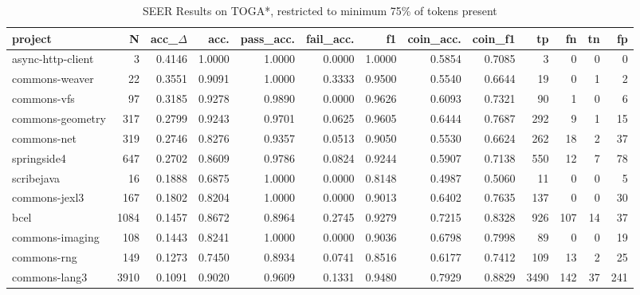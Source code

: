 \begin{table*}
\centering
\caption{SEER Results on TOGA*, restricted to minimum 75\% of tokens present}
\label{tab:toga_results_25}
\begin{tabular}{lrrrrrrrrrrrr}
\toprule
                project &      N &  acc\_$\Delta$ &    acc. &  pass\_acc. &  fail\_acc. &      f1 &  coin\_acc. &  coin\_f1 &     tp &   fn &   tn &    fp \\
\midrule
      async-http-client &      3 &      0.4146 &  1.0000 &     1.0000 &     0.0000 &  1.0000 &     0.5854 &   0.7085 &      3 &    0 &    0 &     0 \\
         commons-weaver &     22 &      0.3551 &  0.9091 &     1.0000 &     0.3333 &  0.9500 &     0.5540 &   0.6644 &     19 &    0 &    1 &     2 \\
            commons-vfs &     97 &      0.3185 &  0.9278 &     0.9890 &     0.0000 &  0.9626 &     0.6093 &   0.7321 &     90 &    1 &    0 &     6 \\
       commons-geometry &    317 &      0.2799 &  0.9243 &     0.9701 &     0.0625 &  0.9605 &     0.6444 &   0.7687 &    292 &    9 &    1 &    15 \\
            commons-net &    319 &      0.2746 &  0.8276 &     0.9357 &     0.0513 &  0.9050 &     0.5530 &   0.6624 &    262 &   18 &    2 &    37 \\
            springside4 &    647 &      0.2702 &  0.8609 &     0.9786 &     0.0824 &  0.9244 &     0.5907 &   0.7138 &    550 &   12 &    7 &    78 \\
             scribejava &     16 &      0.1888 &  0.6875 &     1.0000 &     0.0000 &  0.8148 &     0.4987 &   0.5060 &     11 &    0 &    0 &     5 \\
          commons-jexl3 &    167 &      0.1802 &  0.8204 &     1.0000 &     0.0000 &  0.9013 &     0.6402 &   0.7635 &    137 &    0 &    0 &    30 \\
                   bcel &   1084 &      0.1457 &  0.8672 &     0.8964 &     0.2745 &  0.9279 &     0.7215 &   0.8328 &    926 &  107 &   14 &    37 \\
        commons-imaging &    108 &      0.1443 &  0.8241 &     1.0000 &     0.0000 &  0.9036 &     0.6798 &   0.7998 &     89 &    0 &    0 &    19 \\
            commons-rng &    149 &      0.1273 &  0.7450 &     0.8934 &     0.0741 &  0.8516 &     0.6177 &   0.7412 &    109 &   13 &    2 &    25 \\
          commons-lang3 &   3910 &      0.1091 &  0.9020 &     0.9609 &     0.1331 &  0.9480 &     0.7929 &   0.8829 &   3490 &  142 &   37 &   241 \\

\end{tabular}
\end{table*}
